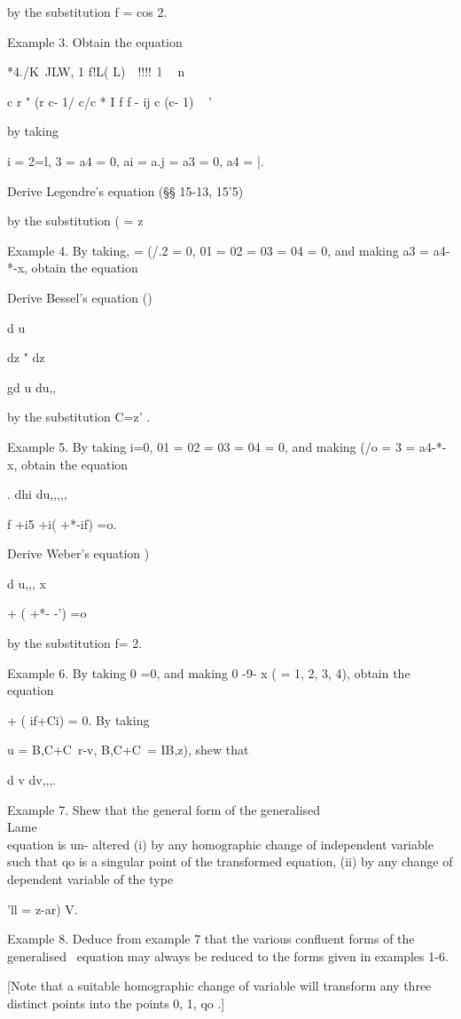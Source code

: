 by the substitution f = cos 2.

Example 3. Obtain the equation

 *4./K\ JLW, 1 f!L( L)\ \ !!!!\ l \ \ n

c r " (r c- 1/ c/c * I f f - ij c (c- 1) ~ '

by taking

 i = 2=l, 3 = a4 = 0, ai = a.j = a3 = 0, a4 = |.

Derive Legendre's equation (§§ 15-13, 15'5)

by the substitution ( = z~\

Example 4. By taking, = (/.2 = 0, 01 = 02 = 03 = 04 = 0, and making
a3 = a4-*-x, obtain the equation

Derive Bessel's equation ()

d u

dz " dz

gd u du,,

by the substitution C=z' .

Example 5. By taking i=0, 01 = 02 = 03 = 04 = 0, and making (/o = 3 =
a4-*-x, obtain the equation

. dhi du,,,,,

f +i5 +i( +*-if) =o.

Derive Weber's equation )

d u,,, x

  + ( +*- -') =o

by the substitution f= 2.

Example 6. By taking 0 =0, and making 0 -9- x ( = 1, 2, 3, 4), obtain
the equation

  + ( if+Ci) = 0. By taking

u = B,C+C\ r-v, B,C+C\ = IB,z), shew that

 d v dv,,,.

%
%

Example 7. Shew that the general form of the generalised \\Lame\\ equation
is un- altered (i) by any homographic change of independent variable
such that qo is a singular point of the transformed equation, (ii) by
any change of dependent variable of the type

'll = z-ar) V.

Example 8. Deduce from example 7 that the various confluent forms of
the generalised \Lame\ equation may always be reduced to the forms given
in examples 1-6.

[Note that a suitable homographic change of variable will transform
any three distinct points into the points 0, 1, qo .]

